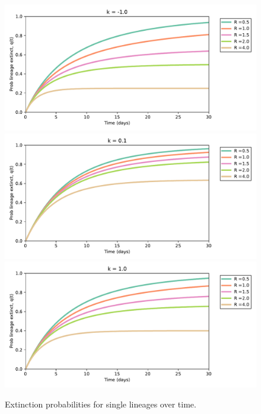 \documentclass[10pt,a4paper]{article}
\begin{document}
\begin{figure}
\centering
\includegraphics[width=1.0\textwidth]{./q_t_k-1.0.pdf}\\
\includegraphics[width=1.0\textwidth]{./q_t_k0.1.pdf}\\
\includegraphics[width=1.0\textwidth]{./q_t_k1.0.pdf}
\caption{Extinction probabilities for single lineages over time.}
\label{fig:q_t}
\end{figure}
\end{document}
